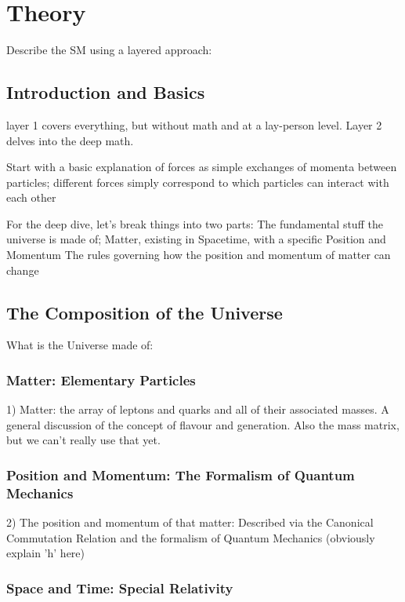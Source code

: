 \chapter{Theory}\label{chapter:experiment}

Describe the SM using a layered approach: 

\section{Introduction and Basics}

    layer 1 covers everything, but without math and at a lay-person level.
    Layer 2 delves into the deep math.

    Start with a basic explanation of forces as simple exchanges of momenta between particles;
    different forces simply correspond to which particles can interact with each other


    For the deep dive, let's break things into two parts:
        The fundamental stuff the universe is made of; Matter, existing in Spacetime, with a specific Position and Momentum
        The rules governing how the position and momentum of matter can change


\section{The Composition of the Universe}

    What is the Universe made of:

    \subsection{Matter: Elementary Particles}

    1) Matter: the array of leptons and quarks and all of their associated masses. A general discussion of the concept of flavour and generation.
        Also the mass matrix, but we can't really use that yet.

    \subsection{Position and Momentum: The Formalism of Quantum Mechanics}

    2) The position and momentum of that matter: Described via the Canonical Commutation Relation and the formalism of Quantum Mechanics (obviously explain 'h' here)

    \subsection{Space and Time: Special Relativity}

